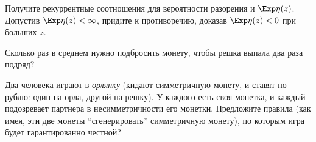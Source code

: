 \begin{ordre}
Получите рекуррентные соотношения для вероятности разорения и  $\Exp \eta(z)$. Допустив  $\Exp \eta(z) < \infty$, придите к противоречию, доказав $\Exp \eta(z) < 0$ при больших $z$.
\end{ordre}

\begin{problem}
Сколько раз в среднем нужно подбросить монету, чтобы решка выпала два раза подряд?
\end{problem}



\begin{problem} 
Два человека играют в {\it орлянку} (кидают симметричную монету, и ставят по рублю: один на орла, другой на решку). У каждого есть своя монетка, и каждый подозревает партнера в несимметричности его монетки. Предложите правила (как имея, эти две монеты ``сгенерировать'' симметричную монету), по которым игра будет гарантированно честной?
\end{problem}